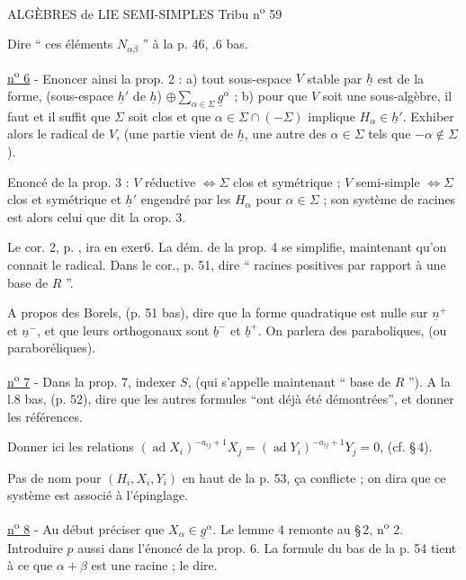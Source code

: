 ALGÈBRES de LIE SEMI-SIMPLES \hfill Tribu n\textsuperscript{o} 59

Dire `` ces éléments $N_{\alpha\beta}$ '' à la p. 46, .6 bas.

\uline{n\textsuperscript{o} 6} - Enoncer ainsi la prop. 2 : a) tout sous-espace $V$ stable par $\underline{h}$ est de la forme, (sous-espace $\underline{h}'$ de $\underline{h}$) $\oplus\sum_{\alpha\in\Sigma}\underline{g}^{\alpha}$ ; b) pour que $V$ soit une sous-algèbre, il faut et il suffit que $\Sigma$ soit clos et que $\alpha\in\Sigma\cap(-\Sigma)$ implique $H_\alpha\in\underline{h}'$. Exhiber alors le radical de $V$, (une partie vient de $\underline{h}$, une autre des $\alpha\in\Sigma$ tels que $-\alpha\notin\Sigma$).

Enoncé de la prop. 3 : $V$ réductive $\Longleftrightarrow\Sigma$ clos et symétrique ; $V$ semi-simple $\Longleftrightarrow\Sigma$ clos et symétrique et $\underline{h}'$ engendré par les $H_\alpha$ pour $\alpha\in\Sigma$ ; son système de racines est alors celui que dit la orop. 3.

Le cor. 2, p. , ira en exer6. La dém. de la prop. 4 se simplifie, maintenant qu'on connait le radical. Dans le cor., p. 51, dire `` racines positives par rapport à une base de $R$ ''.

A propos des Borels, (p. 51 bas), dire que la forme quadratique est nulle sur $\underline{n}^{+}$ et $\underline{n}^{-}$, et que leurs orthogonaux sont $\underline{b}^{-}$ et $\underline{b}^{+}$. On parlera des paraboliques, (ou paraboréliques).

\uline{n\textsuperscript{o} 7} - Dans la prop. 7, indexer $S$, (qui s'appelle maintenant `` base de $R$ ''). A la l.8 bas, (p. 52), dire que les autres formules ``ont déjà été démontrées'', et donner les références.

Donner ici les relations $(\operatorname{ad}X_i)^{-a_{ij}+1}X_j=(\operatorname{ad}Y_i)^{-a_{ij}+1}Y_j=0$, (cf. \S\,4).

Pas de nom pour $(H_i,X_i,Y_i)$ en haut de la p. 53, ça conflicte ; on dira que ce système est associé à l'épinglage.

\uline{n\textsuperscript{o} 8} - Au début préciser que $X_\alpha\in\underline{g}^{\alpha}$. Le lemme 4 remonte au \S\,2, n\textsuperscript{o} 2. Introduire $p$ aussi dans l'énoncé de la prop. 6. La formule du bas de la p. 54 tient à ce que $\alpha+\beta$ est une racine ; le dire.
